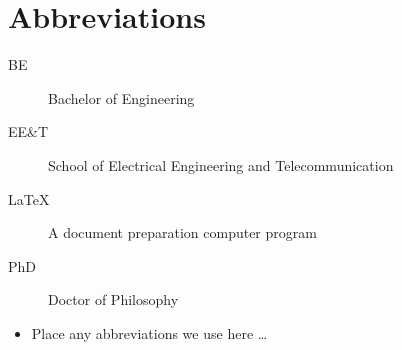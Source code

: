 \chapter*{Abbreviations}\label{abbr}
\begin{description}
\item[BE] Bachelor of Engineering
\item[EE\&T] School of Electrical Engineering and Telecommunication
\item[\LaTeX] A document preparation computer program
\item[PhD] Doctor of Philosophy
\end{description}

\begin{itemize}
  \item Place any abbreviations we use here
\ldots
\end{itemize}
